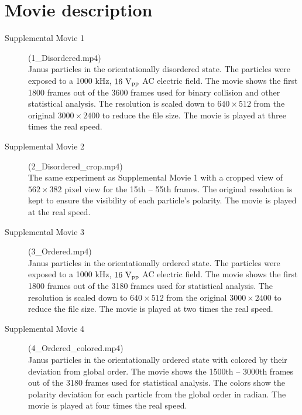 \documentclass[%
 reprint,
 amsmath,amssymb,
 aps,
 floatfix
]{revtex4-2}
\begin{document}
\section{Movie description}
\begin{description}
\item[Supplemental Movie 1] (1\_Disordered.mp4)\\
Janus particles in the orientationally disordered state. The particles were exposed to a 1000 kHz, $16~{{\rm V}_{{\rm pp}}}$ AC electric field. The movie shows the first 1800 frames out of the 3600 frames used for binary collision and other statistical analysis. The resolution is scaled down to $640\times512$ from the original $3000\times2400$ to reduce the file size. The movie is played at three times the real speed.

\item[Supplemental Movie 2] (2\_Disordered\_crop.mp4)\\
The same experiment as Supplemental Movie 1 with a cropped view of $562\times382$ pixel view for the 15th -- 55th frames. The original resolution is kept to ensure the visibility of each particle's polarity. The movie is played at the real speed.

\item[Supplemental Movie 3] (3\_Ordered.mp4)\\
Janus particles in the orientationally ordered state. The particles were exposed to a 1000 kHz, $16~{{\rm V}_{{\rm pp}}}$ AC electric field. The movie shows the first 1800 frames out of the 3180 frames used for statistical analysis. The resolution is scaled down to $640\times512$ from the original $3000\times2400$ to reduce the file size. The movie is played at two times the real speed.

\item[Supplemental Movie 4] (4\_Ordered\_colored.mp4)\\
Janus particles in the orientationally ordered state with colored by their deviation from global order. The movie shows the 1500th -- 3000th frames out of the 3180 frames used for statistical analysis. The colors show the polarity deviation for each particle from the global order in radian. The movie is played at four times the real speed.
\end{description}
\end{document}
